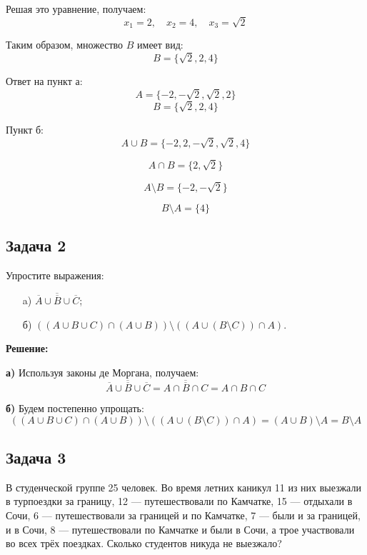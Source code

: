 \documentclass[a4paper,12pt]{article}
\begin{document}
Решая это уравнение, получаем:
\[
x_1 = 2, \quad x_2 = 4, \quad x_3 = \sqrt{2}
\]

Таким образом, множество \(B\) имеет вид:
\[
B = \{\sqrt{2}, 2, 4\}
\]

Ответ на пункт а:
\[
A = \{-2, -\sqrt{2}, \sqrt{2}, 2\}
\]
\[
B = \{\sqrt{2}, 2, 4\}
\]

Пункт б:
\[
A\cup B = \{-2, 2, -\sqrt{2}, \sqrt{2}, 4\}
\]

\[
A\cap B = \{2, \sqrt{2}\}
\]

\[
A\setminus B = \{-2, -\sqrt{2}\}
\]

\[
B\setminus A = \{4\}
\]
\vspace{1cm}


\subsection{Задача 2}

Упростите выражения:
\begin{itemize}
    \item[a)] \(\overline{\overline{A} \cup \overline{B} \cup \overline{C}}\);
    \item[б)] \(((A \cup B \cup C) \cap (A \cup B)) \setminus ((A \cup (B \setminus C)) \cap A)\).
\end{itemize}

\textbf{Решение:}

\textbf{а)} Используя законы де Моргана, получаем:
\[
\overline{\overline{A} \cup \overline{B} \cup \overline{C}} = \overline{\overline{A \cap B \cap C}} = A \cap B \cap C
\]

\textbf{б)} Будем постепенно упрощать:
\[
((A \cup B \cup C) \cap (A \cup B)) \setminus ((A \cup (B \setminus C)) \cap A) = (A \cup B) \setminus A = B \setminus A
\]

\vspace{1cm}



\subsection{Задача 3}

В студенческой группе 25 человек. Во время летних каникул 11 из них выезжали в турпоездки за границу, 12 — путешествовали по Камчатке, 15 — отдыхали в Сочи, 6 — путешествовали за границей и по Камчатке, 7 — были и за границей, и в Сочи, 8 — путешествовали по Камчатке и были в Сочи, а трое участвовали во всех трёх поездках. Сколько студентов никуда не выезжало?
\end{document}
